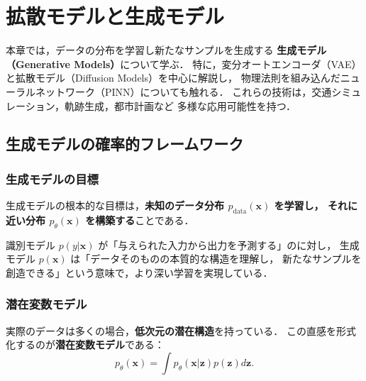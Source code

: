 
\chapter{拡散モデルと生成モデル}
\label{chap:generative}

本章では，データの分布を学習し新たなサンプルを生成する
\textbf{生成モデル（Generative Models）}について学ぶ．
特に，変分オートエンコーダ（VAE）と拡散モデル（Diffusion Models）を中心に解説し，
物理法則を組み込んだニューラルネットワーク（PINN）についても触れる．
これらの技術は，交通シミュレーション，軌跡生成，都市計画など
多様な応用可能性を持つ．

\section{生成モデルの確率的フレームワーク}
\label{sec:generative-framework}

\subsection{生成モデルの目標}

生成モデルの根本的な目標は，\textbf{未知のデータ分布 $p_{\mathrm{data}}(\boldsymbol{x})$ を学習し，
それに近い分布 $p_\theta(\boldsymbol{x})$ を構築する}ことである．

識別モデル $p(y|\boldsymbol{x})$ が「与えられた入力から出力を予測する」のに対し，
生成モデル $p(\boldsymbol{x})$ は「データそのものの本質的な構造を理解し，
新たなサンプルを創造できる」という意味で，より深い学習を実現している．

\subsection{潜在変数モデル}

実際のデータは多くの場合，\textbf{低次元の潜在構造}を持っている．
この直感を形式化するのが\textbf{潜在変数モデル}である：
\begin{equation}
  p_\theta(\boldsymbol{x}) = \int p_\theta(\boldsymbol{x}|\boldsymbol{z}) p(\boldsymbol{z}) d\boldsymbol{z}.
  \label{eq:latent-model}
\end{equation}

